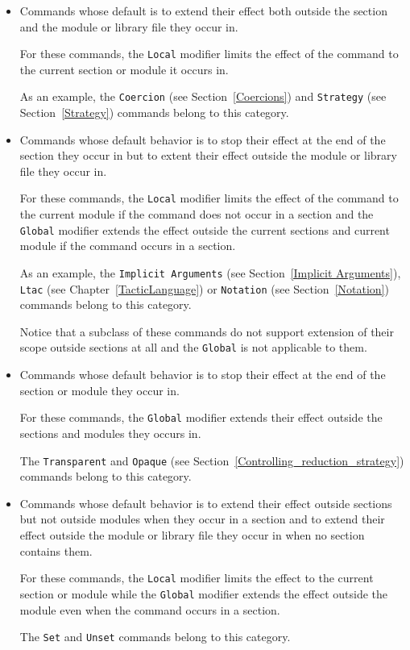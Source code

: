 \begin{itemize}
\item Commands whose default is to extend their effect both outside the
  section and the module or library file they occur in.

  For these commands, the {\tt Local} modifier limits the effect of
  the command to the current section or module it occurs in.

  As an example, the {\tt Coercion} (see Section~\ref{Coercions})
  and {\tt Strategy} (see Section~\ref{Strategy})
  commands belong to this category.

\item Commands whose default behavior is to stop their effect at the
  end of the section they occur in but to extent their effect outside
  the module or library file they occur in.

  For these commands, the {\tt Local} modifier limits the effect of
  the command to the current module if the command does not occur in a
  section and the {\tt Global} modifier extends the effect outside the
  current sections and current module if the command occurs in a
  section.

  As an example, the {\tt Implicit Arguments} (see
  Section~\ref{Implicit Arguments}), {\tt Ltac} (see
  Chapter~\ref{TacticLanguage}) or {\tt Notation} (see
  Section~\ref{Notation}) commands belong to this category.

  Notice that a subclass of these commands do not support extension of
  their scope outside sections at all and the {\tt Global} is not
  applicable to them.

\item Commands whose default behavior is to stop their effect at the
  end of the section or module they occur in.

  For these commands, the {\tt Global} modifier extends their effect
  outside the sections and modules they occurs in.

  The {\tt Transparent} and {\tt Opaque} (see
  Section~\ref{Controlling_reduction_strategy}) commands belong to
  this category.

\item Commands whose default behavior is to extend their effect
  outside sections but not outside modules when they occur in a
  section and to extend their effect outside the module or library
  file they occur in when no section contains them.

  For these commands, the {\tt Local} modifier limits the effect to
  the current section or module while the {\tt Global} modifier extends
  the effect outside the module even when the command occurs in a section.

  The {\tt Set} and {\tt Unset} commands belong to this category.
\end{itemize}



